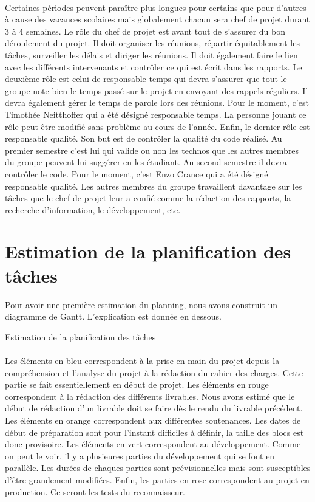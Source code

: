 \paragraph{}
Certaines périodes peuvent paraître plus longues pour certains que pour d’autres à cause des vacances
scolaires mais globalement chacun sera chef de projet durant 3 à 4 semaines. Le rôle du chef de projet est
avant tout de s’assurer du bon déroulement du projet. Il doit organiser les réunions, répartir équitablement
les tâches, surveiller les délais et diriger les réunions. Il doit également faire le lien avec les
différents intervenants et contrôler ce qui est écrit dans les rapports. Le deuxième rôle est celui de
responsable temps qui devra s’assurer que tout le groupe note bien le temps passé sur le projet en envoyant
des rappels réguliers. Il devra également gérer le temps de parole lors des réunions. Pour le moment,
c’est Timothée Neitthoffer qui a été désigné responsable temps. La personne jouant ce rôle peut être
modifié sans problème au cours de l’année. Enfin, le dernier rôle est responsable qualité. Son but est de
contrôler la qualité du code réalisé. Au premier semestre c’est lui qui valide ou non les technos que les
autres membres du groupe peuvent lui suggérer en les étudiant. Au second semestre il devra contrôler le code.
Pour le moment, c’est Enzo Crance qui a été désigné responsable qualité. Les autres membres du groupe travaillent
davantage sur les tâches que le chef de projet leur a confié comme la rédaction des rapports, la
recherche d’information, le développement, etc.

\section{Estimation de la planification des tâches}

Pour avoir une première estimation du planning, nous avons construit un diagramme de Gantt. L’explication est donnée en dessous.


Estimation de la planification des tâches

\paragraph{}
Les éléments en bleu correspondent à la prise en main du projet depuis la compréhension et l’analyse du projet
à la rédaction du cahier des charges. Cette partie se fait essentiellement en début de projet. Les éléments en rouge
correspondent à la rédaction des différents livrables. Nous avons estimé que le début de rédaction d’un livrable
doit se faire dès le rendu du livrable précédent. Les éléments en orange correspondent aux différentes soutenances.
Les dates de début de préparation sont pour l’instant difficiles à définir, la taille des blocs est donc provisoire.
Les éléments en vert correspondent au développement. Comme on peut le voir, il y a plusieures parties du développement
qui se font en parallèle. Les durées de chaques parties sont prévisionnelles mais sont susceptibles d’être grandement modifiées.
Enfin, les parties en rose correspondent au projet en production. Ce seront les tests du reconnaisseur.